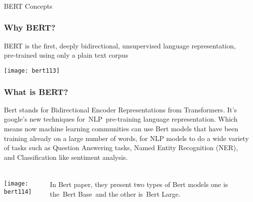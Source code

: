 \begin{frame}[fragile]\frametitle{}
\begin{center}
{\Large BERT Concepts}
\end{center}
\end{frame}

\begin{frame}[fragile]\frametitle{Why BERT?}

BERT is the first, deeply bidirectional, unsupervised language representation, pre-trained using only a plain text corpus

			\begin{center}
			\texttt{[image: bert113]}
			\end{center}		
			

\end{frame}

\begin{frame}[fragile]\frametitle{What is BERT?}


			\begin{center}
Bert stands for Bidirectional Encoder Representations from Transformers. It’s google’s new techniques for NLP pre-training language representation. Which means now machine learning communities can use Bert models that have been training already on a large number of words, for NLP models to do a wide variety of tasks such as Question Answering tasks, Named Entity Recognition (NER), and Classification like sentiment analysis.
			\end{center}		
			

\end{frame}

\begin{frame}[fragile]\frametitle{}

\begin{columns}
    \begin{column}[T]{0.5\linewidth}
			\begin{center}
			\texttt{[image: bert114]}
			\end{center}		
		\end{column}
    \begin{column}[T]{0.5\linewidth}
In Bert paper, they present two types of Bert models one is the Bert Base and the other is Bert Large.

    \end{column}
  \end{columns}
			
\end{frame}

